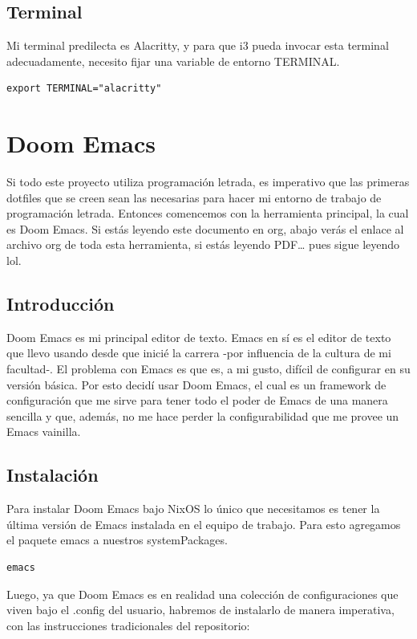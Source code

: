 \documentclass[11pt]{article}
\begin{document}
\subsection{Terminal}
\label{sec:org10c97c5}

Mi terminal predilecta es Alacritty, y para que i3 pueda invocar esta terminal adecuadamente, necesito fijar una variable de entorno TERMINAL.

\begin{verbatim}
export TERMINAL="alacritty"
\end{verbatim}
\section{Doom Emacs}
\label{sec:org0041edc}

Si todo este proyecto utiliza programación letrada, es imperativo que las primeras dotfiles que se creen sean las necesarias para hacer mi entorno de trabajo de programación letrada. Entonces comencemos con la herramienta principal, la cual es Doom Emacs. Si estás leyendo este documento en org, abajo verás el enlace al archivo org de toda esta herramienta, si estás leyendo PDF\ldots{} pues sigue leyendo lol.
\subsection{Introducción}
\label{sec:org4efba2a}
Doom Emacs es mi principal editor de texto. Emacs en sí es el editor de texto que llevo usando desde que inicié la carrera -por influencia de la cultura de mi facultad-. El problema con Emacs es que es, a mi gusto, difícil de configurar en su versión básica. Por esto decidí usar Doom Emacs, el cual es un framework de configuración que me sirve para tener todo el poder de Emacs de una manera sencilla y que, además, no me hace perder la configurabilidad que me provee un Emacs vainilla.
\subsection{Instalación}
\label{sec:org5ecfb25}

Para instalar Doom Emacs bajo NixOS lo único que necesitamos es tener la última versión de Emacs instalada en el equipo de trabajo. Para esto agregamos el paquete emacs a nuestros systemPackages.

\begin{verbatim}
emacs
\end{verbatim}

Luego, ya que Doom Emacs es en realidad una colección de configuraciones que viven bajo el .config del usuario, habremos de instalarlo de manera imperativa, con las instrucciones tradicionales del repositorio:
\end{document}
